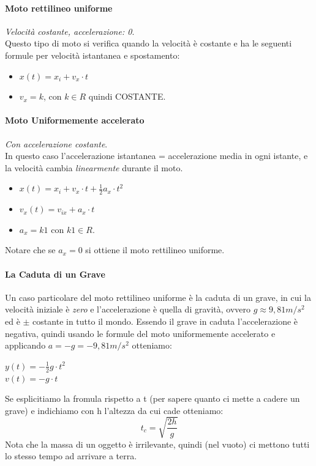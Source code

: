 \documentclass[12pt, a4paper, openany]{book}
\begin{document}
\paragraph*{Moto rettilineo uniforme}\emph{Velocità costante, accelerazione: 0}.
\\Questo tipo di moto si verifica quando la velocità è costante e ha le seguenti formule per velocità istantanea e spostamento:
\begin{itemize}
    \item $x(t)= x_i + v_x \cdot t$
    \item $v_x = k$, con $k\in R$ quindi COSTANTE.
\end{itemize}
\paragraph*{Moto Uniformemente accelerato} \emph{Con accelerazione costante}.
\\In questo caso l'accelerazione istantanea = accelerazione media in ogni istante, e la velocità cambia \emph{linearmente} durante il moto.
\begin{itemize}
    \item $x(t) = x_i + v_x\cdot t +\frac{1}{2} a_x \cdot t^2$
    \item $v_x(t) = v_{ix} + a_x \cdot t$
    \item $a_x = k1$ con $k1 \in R$.
\end{itemize}
Notare che se $a_x=0$ si ottiene il moto rettilineo uniforme.

\paragraph*{La Caduta di un Grave}
Un caso particolare del moto rettilineo uniforme è la caduta di un grave, in cui la velocità iniziale è \emph{zero} e
l'accelerazione è quella di gravità, ovvero $g\approx 9,81m/s^2$ ed è $\pm$ costante in tutto il mondo.
Essendo il grave in caduta l'accelerazione è negativa, quindi usando le formule del moto uniformemente accelerato e applicando $a=-g=-9,81m/s^2$ otteniamo:
\begin{center} %
    $y(t)=-\frac{1}{2} g\cdot t^2$\\$ v(t) = -g \cdot t$
\end{center}
Se esplicitiamo la fromula rispetto a t (per sapere quanto ci mette a cadere un grave) e indichiamo con h l'altezza da cui cade otteniamo:
$$t_c =\sqrt{\frac{2h}{g}}$$
Nota che la massa di un oggetto è irrilevante, quindi (nel vuoto) ci mettono tutti lo stesso tempo ad arrivare a terra.
\end{document}
